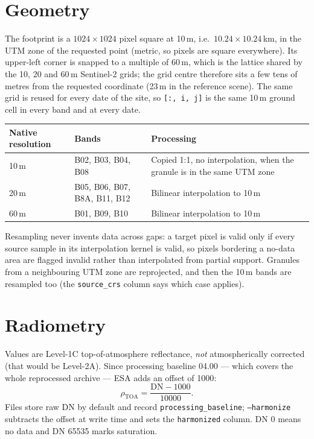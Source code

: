 \documentclass[10pt,a4paper]{article}
\begin{document}
\section{Geometry}

The footprint is a $1024\times1024$ pixel square at 10\,m, i.e.\ $10.24\times10.24$\,km, in the
UTM zone of the requested point (metric, so pixels are square everywhere). Its upper-left corner
is snapped to a multiple of 60\,m, which is the lattice shared by the 10, 20 and 60\,m Sentinel-2
grids; the grid centre therefore sits a few tens of metres from the requested coordinate
(23\,m in the reference scene). The same grid is reused for every date of the site, so
\texttt{[:,\,i,\,j]} is the same 10\,m ground cell in every band and at every date.

\begin{center}
\small
\begin{tabular}{llp{7.9cm}}
\toprule
Native resolution & Bands & Processing \\
\midrule
10\,m & B02, B03, B04, B08 & Copied 1:1, no interpolation, when the granule is in the same UTM zone \\
20\,m & B05, B06, B07, B8A, B11, B12 & Bilinear interpolation to 10\,m \\
60\,m & B01, B09, B10 & Bilinear interpolation to 10\,m \\
\bottomrule
\end{tabular}
\end{center}

Resampling never invents data across gaps: a target pixel is valid only if every source sample
in its interpolation kernel is valid, so pixels bordering a no-data area are flagged invalid
rather than interpolated from partial support. Granules from a neighbouring UTM zone are
reprojected, and then the 10\,m bands are resampled too (the \texttt{source\_crs} column says
which case applies).

\section{Radiometry}

Values are Level-1C top-of-atmosphere reflectance, \emph{not} atmospherically corrected (that
would be Level-2A). Since processing baseline 04.00 --- which covers the whole reprocessed
archive --- ESA adds an offset of 1000:
\begin{equation*}
  \rho_{\text{TOA}} = \frac{\mathrm{DN} - 1000}{10000}.
\end{equation*}
Files store raw DN by default and record \texttt{processing\_baseline}; \texttt{--harmonize}
subtracts the offset at write time and sets the \texttt{harmonized} column. DN 0 means no data
and DN 65535 marks saturation.
\end{document}
